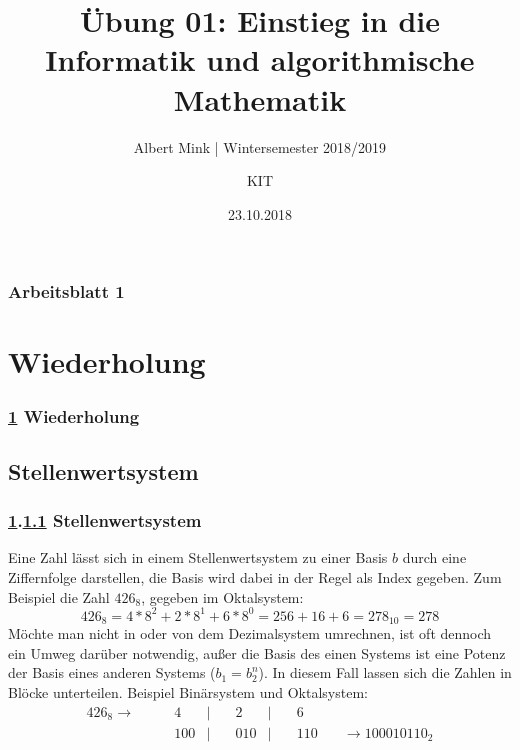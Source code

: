 \documentclass[c,18pt]{beamer}
\date{23.10.2018}
\title[Übung 01: Einstieg in die Informatik und algorithmische]
  {Übung 01: Einstieg in die Informatik und algorithmische \\ Mathematik}
\subtitle{Albert Mink | Wintersemester 2018/2019}
\author[Albert Mink, ]{KIT}
\institute[Institut für Angewandte und Numerische Mathematik (IANM)]{Institut für Angewandte und Numerische Mathematik}
\begin{document}
\begin{frame}
  \maketitle
\end{frame}

\begin{frame}
  \frametitle{Arbeitsblatt 1}%
\end{frame}

\section{Wiederholung}\label{K:wdh}
\begin{frame}
  \frametitle{\ref{K:wdh} Wiederholung}%
\tableofcontents[current]
\end{frame}


\def\stitle{Stellenwertsystem}
\subsection{\stitle}\label{S:Stellenwertsystem}
\begin{frame}[fragile]%
  \frametitle{\ref{K:wdh}.\ref{S:Stellenwertsystem} \stitle}%
\medskip

Eine Zahl l\"asst sich in einem Stellenwertsystem zu einer Basis $b$ durch eine Ziffernfolge darstellen, die Basis wird dabei in der Regel als Index gegeben.
Zum Beispiel die Zahl $426_8$, gegeben im Oktalsystem:
\begin{equation*}
426_8 = 4*8^2 + 2*8^1 + 6*8^0 = 256 + 16 + 6 = 278_{10} = 278
\end{equation*}
M\"ochte man nicht in oder von dem Dezimalsystem umrechnen, ist oft dennoch ein Umweg dar\"uber notwendig, au\ss er die Basis des einen Systems ist eine Potenz der Basis eines anderen Systems ($b_1 = b_2^n$).
In diesem Fall lassen sich die Zahlen in Bl\"ocke unterteilen.
Beispiel Bin\"arsystem und Oktalsystem:
\begin{align*}
426_8 \rightarrow \quad & \quad   4 & | & \quad   2 & | & \quad   6 & \\
                        & \quad 100 & | & \quad 010 & | & \quad 110 & \quad \rightarrow 100010110_2
\end{align*}

\end{frame}
\end{document}
